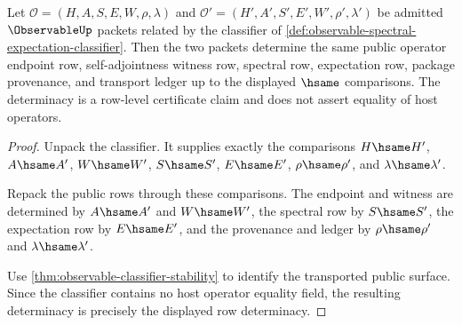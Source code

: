 \begin{theorem}
\label{thm:observable-operator-row-classifier-determinacy}
Let $\mathcal{O}=(H,A,S,E,W,\rho,\lambda)$ and
$\mathcal{O}'=(H',A',S',E',W',\rho',\lambda')$ be admitted
$\ObservableUp$ packets related by the classifier of
\autoref{def:observable-spectral-expectation-classifier}. Then the two packets
determine the same public operator endpoint row, self-adjointness witness row,
spectral row, expectation row, package provenance, and transport ledger up to
the displayed $\hsame$ comparisons. The determinacy is a row-level certificate
claim and does not assert equality of host operators.
\end{theorem}
\begin{proof}
Unpack the classifier. It supplies exactly the comparisons
$H\hsame H'$, $A\hsame A'$, $W\hsame W'$, $S\hsame S'$,
$E\hsame E'$, $\rho\hsame\rho'$, and $\lambda\hsame\lambda'$.

Repack the public rows through these comparisons. The endpoint and witness are
determined by $A\hsame A'$ and $W\hsame W'$, the spectral row by
$S\hsame S'$, the expectation row by $E\hsame E'$, and the provenance and
ledger by $\rho\hsame\rho'$ and $\lambda\hsame\lambda'$.

Use \autoref{thm:observable-classifier-stability} to identify the transported
public surface. Since the classifier contains no host operator equality field,
the resulting determinacy is precisely the displayed row determinacy.
\end{proof}

